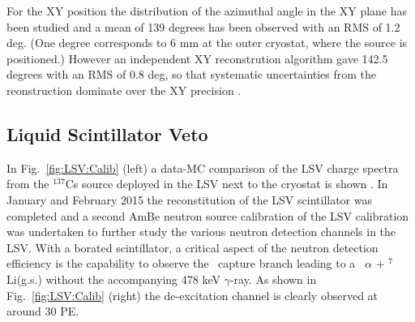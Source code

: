 For the XY position the distribution of the azimuthal angle in the XY plane has been studied and a mean of 139 degrees has been observed with an RMS of 1.2 deg. (One degree corresponds to 6 mm at the outer cryostat, where the source is positioned.) However an independent XY reconstrution algorithm gave 142.5 degrees with an RMS of 0.8 deg, so that systematic uncertainties from the reonstruction dominate over the XY precision \cite{DS:XY:paper}.



\subsection{Liquid Scintillator Veto}\label{sec:LSV:gammasources}

In Fig.~\ref{fig:LSV:Calib} (left) a data-MC comparison of the LSV charge spectra from the $^{137}$Cs source deployed in the LSV next to the cryostat is shown \cite{DS50:G4DS:paper}.
In January and February 2015 the reconstitution of the LSV scintillator was completed and a second AmBe neutron source calibration of the LSV calibration was undertaken to further study the various neutron detection channels in the LSV. With a borated scintillator, a critical aspect of the neutron detection efficiency is the capability to observe the \brbortenground\
capture branch leading to a \enbortengroundalpha\ $\alpha$ + $^7$Li(g.s.) without the accompanying 478 keV $\gamma$-ray. As shown in Fig.~\ref{fig:LSV:Calib} (right) the de-excitation channel is clearly observed at around 30 PE.

